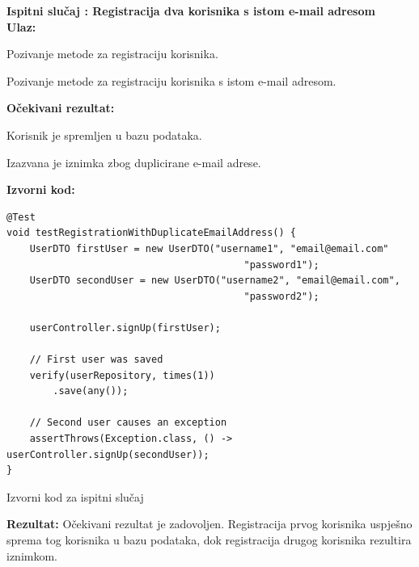 			\noindent \textbf{Ispitni slučaj \thetestcase: Registracija dva korisnika s istom e-mail adresom} \\
			\noindent \textbf{Ulaz:}
			\begin{packed_enum}
				\item Pozivanje metode za registraciju korisnika.
				\item Pozivanje metode za registraciju korisnika s istom e-mail adresom.
			\end{packed_enum}
			\noindent \textbf{Očekivani rezultat:}
			\begin{packed_enum}
				\item[1.a] Korisnik je spremljen u bazu podataka.
				\item[2.a] Izazvana je iznimka zbog duplicirane e-mail adrese.
			\end{packed_enum}
			\noindent \textbf{Izvorni kod:}
			\begin{listing}[H]
\begin{verbatim}
@Test
void testRegistrationWithDuplicateEmailAddress() {
	UserDTO firstUser = new UserDTO("username1", "email@email.com"
                                         "password1");
	UserDTO secondUser = new UserDTO("username2", "email@email.com",
                                         "password2");
		
	userController.signUp(firstUser);
	
	// First user was saved
	verify(userRepository, times(1))
	    .save(any());
	
	// Second user causes an exception
	assertThrows(Exception.class, () -> userController.signUp(secondUser));
}
\end{verbatim}
				\caption{Izvorni kod za ispitni slučaj \thetestcase}
				\label{testRegistrationWithDuplicateEmailAddress}
			\end{listing}
			\noindent \textbf{Rezultat:} Očekivani rezultat je zadovoljen. Registracija prvog korisnika uspješno sprema tog korisnika u bazu podataka, dok registracija drugog korisnika rezultira iznimkom. 
			\clearpage

